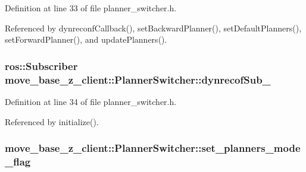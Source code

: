 Definition at line 33 of file planner\+\_\+switcher.\+h.



Referenced by dynreconf\+Callback(), set\+Backward\+Planner(), set\+Default\+Planners(), set\+Forward\+Planner(), and update\+Planners().

\subsubsection[{\texorpdfstring{dynrecof\+Sub\+\_\+}{dynrecofSub_}}]{\setlength{\rightskip}{0pt plus 5cm}ros\+::\+Subscriber move\+\_\+base\+\_\+z\+\_\+client\+::\+Planner\+Switcher\+::dynrecof\+Sub\+\_\+\hspace{0.3cm}{\ttfamily [private]}}\hypertarget{classmove__base__z__client_1_1PlannerSwitcher_a088bde4ce0fece46776a9f4efe417e15}{}\label{classmove__base__z__client_1_1PlannerSwitcher_a088bde4ce0fece46776a9f4efe417e15}


Definition at line 34 of file planner\+\_\+switcher.\+h.



Referenced by initialize().

\subsubsection[{\texorpdfstring{set\+\_\+planners\+\_\+mode\+\_\+flag}{set_planners_mode_flag}}]{ move\+\_\+base\+\_\+z\+\_\+client\+::\+Planner\+Switcher\+::set\+\_\+planners\+\_\+mode\+\_\+flag\hspace{0.3cm}{\ttfamily [private]}}\hypertarget{classmove__base__z__client_1_1PlannerSwitcher_a74c0b5c21064a868700288e759446ac5}{}\label{classmove__base__z__client_1_1PlannerSwitcher_a74c0b5c21064a868700288e759446ac5}


